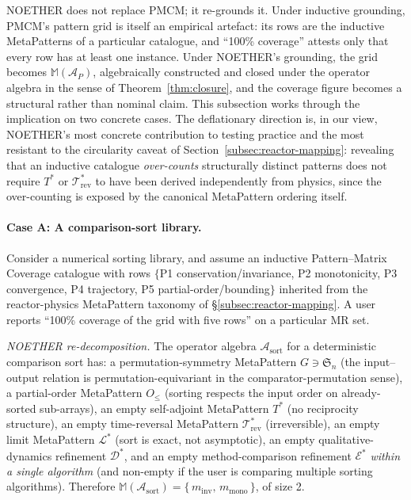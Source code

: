 \documentclass[acmsmall,screen,review]{acmart}
\begin{document}
NOETHER does not replace PMCM; it re-grounds it. Under inductive grounding, PMCM's pattern grid is itself an empirical artefact: its rows are the inductive MetaPatterns of a particular catalogue, and ``100\% coverage'' attests only that every row has at least one instance. Under NOETHER's grounding, the grid becomes $\mathbb{M}(\mathcal{A}_P)$, algebraically constructed and closed under the operator algebra in the sense of Theorem~\ref{thm:closure}, and the coverage figure becomes a structural rather than nominal claim. This subsection works through the implication on two concrete cases. The deflationary direction is, in our view, NOETHER's most concrete contribution to testing practice and the most resistant to the circularity caveat of Section~\ref{subsec:reactor-mapping}: revealing that an inductive catalogue \emph{over-counts} structurally distinct patterns does not require $T^{*}$ or $\mathcal{T}^{*}_{\mathrm{rev}}$ to have been derived independently from physics, since the over-counting is exposed by the canonical MetaPattern ordering itself.

\paragraph{Case A: A comparison-sort library.}
Consider a numerical sorting library, and assume an inductive Pattern--Matrix Coverage catalogue with rows $\{$P1 conservation/invariance, P2 monotonicity, P3 convergence, P4 trajectory, P5 partial-order/bounding$\}$ inherited from the reactor-physics MetaPattern taxonomy of \S\ref{subsec:reactor-mapping}. A user reports ``100\% coverage of the grid with five rows'' on a particular MR set.

\noindent \emph{NOETHER re-decomposition.} The operator algebra $\mathcal{A}_{\mathrm{sort}}$ for a deterministic comparison sort has: a permutation-symmetry MetaPattern $G \ni \mathfrak{S}_n$ (the input--output relation is permutation-equivariant in the comparator-permutation sense), a partial-order MetaPattern $O_{\le}$ (sorting respects the input order on already-sorted sub-arrays), an empty self-adjoint MetaPattern $T^{*}$ (no reciprocity structure), an empty time-reversal MetaPattern $\mathcal{T}^{*}_{\mathrm{rev}}$ (irreversible), an empty limit MetaPattern $\mathcal{L}^{*}$ (sort is exact, not asymptotic), an empty qualitative-dynamics refinement $\mathcal{D}^{*}$, and an empty method-comparison refinement $\mathcal{E}^{*}$ \emph{within a single algorithm} (and non-empty if the user is comparing multiple sorting algorithms). Therefore $\mathbb{M}(\mathcal{A}_{\mathrm{sort}}) = \{\,m_{\mathrm{inv}},\, m_{\mathrm{mono}}\,\}$, of size 2.
\end{document}
